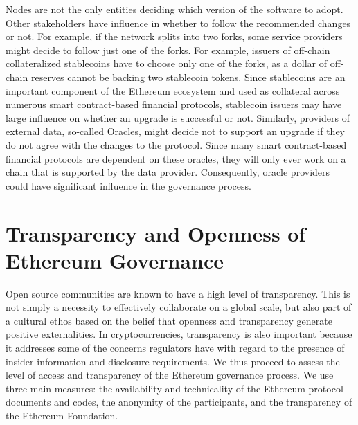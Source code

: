 \documentclass[No]{AEA}
\begin{document}
Nodes are not the only entities deciding which version of the software to adopt. Other stakeholders have influence in whether to follow the recommended changes or not. For example, if the network splits into two forks, some service providers might decide to follow just one of the forks. For example, issuers of off-chain collateralized stablecoins have to choose only one of the forks, as a dollar of off-chain reserves cannot be backing two stablecoin tokens. Since stablecoins are an important component of the Ethereum ecosystem and used as collateral across numerous smart contract-based financial protocols, stablecoin issuers may have large influence on whether an upgrade is successful or not. Similarly, providers of external data, so-called Oracles, might decide not to support an upgrade if they do not agree with the changes to the protocol. Since many smart contract-based financial protocols are dependent on these oracles, they will only ever work on a chain that is supported by the data provider. Consequently, oracle providers could have significant influence in the governance process. 

\section{Transparency and Openness of Ethereum Governance} \label{sec:transparency}


Open source communities are known to have a high level of transparency. This is not simply a necessity to effectively collaborate on a global scale, but also part of a cultural ethos based on the belief that openness and transparency generate positive externalities. In cryptocurrencies, transparency is also important because it addresses some of the concerns regulators have with regard to the presence of insider information and disclosure requirements. We thus proceed to assess the level of access and transparency of the Ethereum governance process. We use three main measures: the availability and technicality of the Ethereum protocol documents and codes, the anonymity of the participants, and the transparency of the Ethereum Foundation. 
\end{document}
